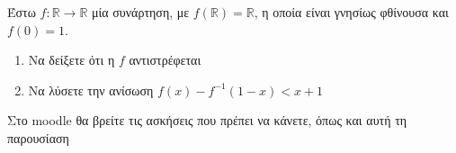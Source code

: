 \documentclass{presentation}
\begin{document}
\begin{askisi}
  Έστω $f:\mathbb{R}\to\mathbb{R}$ μία συνάρτηση, με $f(\mathbb{R})=\mathbb{R}$, η οποία είναι γνησίως φθίνουσα και $f(0)=1$.
  \begin{enumerate}
    \item Να δείξετε ότι η $f$ αντιστρέφεται \pause
    \item Να λύσετε την ανίσωση $f(x)-f^{-1}(1-x)<x+1$
  \end{enumerate}
\end{askisi}

\begin{frame}
  Στο moodle θα βρείτε τις ασκήσεις που πρέπει να κάνετε, όπως και αυτή τη παρουσίαση
\end{frame}
\end{document}
